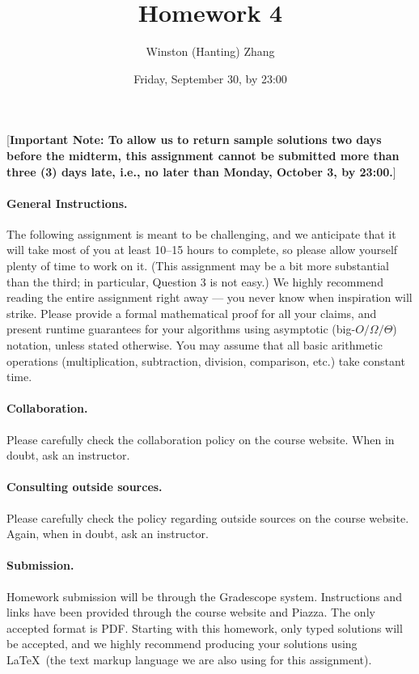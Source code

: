 \documentclass[10pt]{article}
\title{\bf Homework 4}
\author{Winston (Hanting) Zhang}
\date{Friday, September 30, by 23:00}
\begin{document}
\maketitle

[\textbf{Important Note: To allow us to return sample solutions two days before the midterm, this assignment cannot be submitted more than three (3) days late, i.e., no later than Monday, October 3, by 23:00.}]

\paragraph{General Instructions.} The following assignment is meant to be challenging, and we anticipate that it will take most of you at least 10--15 hours to complete, so please allow yourself plenty of time to work on it. (This assignment may be a bit more substantial than the third; in particular, Question 3 is not easy.)
We highly recommend reading the entire assignment right away --- you never know when inspiration will strike.
Please provide a formal mathematical proof for all your claims, and  present runtime guarantees for your algorithms using asymptotic (big-$O/\Omega/\Theta$) notation, unless stated otherwise. You may assume that all basic arithmetic operations (multiplication, subtraction, division, comparison, etc.) take constant time. %

\paragraph{Collaboration.}  Please carefully check the collaboration policy on the course website. When in doubt, ask an instructor.

\paragraph{Consulting outside sources.} Please carefully check the policy regarding outside sources on the course website. Again, when in doubt, ask an instructor.

\paragraph{Submission.} Homework submission will be through the Gradescope system. Instructions and links have been provided through the course website and Piazza. The only accepted format is PDF. Starting with this homework, only typed solutions will be accepted, and we highly recommend producing your solutions using \LaTeX~(the text markup language we are also using for this assignment).
\end{document}
